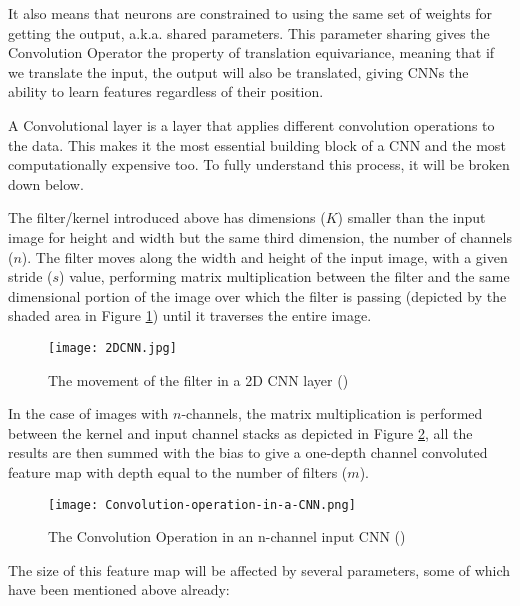 It also means that neurons are constrained to using the same set of weights for getting the output, \gls{a.k.a.} shared parameters. This parameter sharing gives the Convolution Operator the property of translation equivariance, meaning that if we translate the input, the output will also be translated, giving \gls{CNN}s the ability to learn features regardless of their position.

A Convolutional layer is a layer that applies different convolution operations to the data. This makes it the most essential building block of a \gls{CNN} and the most computationally expensive too. To fully understand this process, it will be broken down below.

The filter/kernel introduced above has dimensions ($K$) smaller than the input image for height and width but the same third dimension, the number of channels ($n$). The filter moves along the width and height of the input image, with a given stride ($s$) value, performing matrix multiplication between the filter and the same dimensional portion of the image over which the filter is passing (depicted by the shaded area in Figure \ref{fig_cnn_filter}) until it traverses the entire image.

    \begin{figure}[hbt!]
        \centering
        \texttt{[image: 2DCNN.jpg]}
        \caption{The movement of the filter in a 2D \gls{CNN} layer (\cite{2dcnnpic})}
        \label{fig_cnn_filter}
    \end{figure}
     
In the case of images with $n$-channels, the matrix multiplication is performed between the kernel and input channel stacks as depicted in Figure \ref{fig_cnn_conv}, all the results are then summed with the bias to give a one-depth channel convoluted feature map with depth equal to the number of filters ($m$).

    \begin{figure}[hbt!]
        \centering
        \texttt{[image: Convolution-operation-in-a-CNN.png]}
        \caption{The Convolution Operation in an n-channel input \gls{CNN} (\cite{9053228})}
        \label{fig_cnn_conv}
    \end{figure}
      
The size of this feature map will be affected by several parameters, some of which have been mentioned above already:

